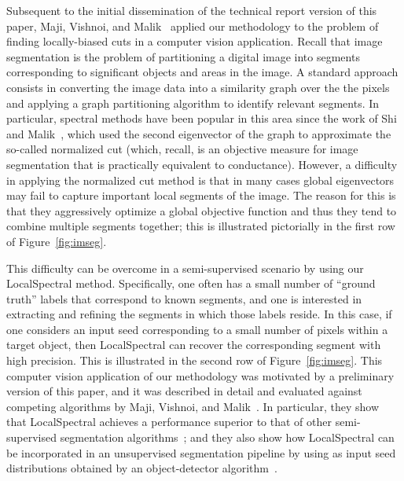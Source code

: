 \documentclass[11pt]{article}
\begin{document}
Subsequent to the initial dissemination of the technical report version of 
this paper, Maji, Vishnoi, and Malik~\cite{MVM11} applied our methodology to 
the problem of finding locally-biased cuts in a computer vision application.
Recall that image segmentation is the problem of partitioning a digital image 
into segments corresponding to significant objects and areas in the image. 
A standard approach consists in converting the image data into a similarity 
graph over the the pixels and applying a graph partitioning algorithm to 
identify relevant segments. 
In particular, spectral methods have been popular in this area since the 
work of Shi and Malik~\cite{ShiMalik00_NCut}, which used the second 
eigenvector of the graph to approximate the so-called normalized cut 
(which, recall, is an objective measure for image segmentation that is 
practically equivalent to conductance). 
However, a difficulty in applying the normalized cut method is that in many 
cases global eigenvectors may fail to capture important local segments of 
the image.
The reason for this is that they aggressively optimize a global objective 
function and thus they tend to combine multiple segments together; 
this is illustrated pictorially in the first row of Figure~\ref{fig:imseg}.

This difficulty can be overcome in a semi-supervised scenario by using 
our \textsf{LocalSpectral} method. 
Specifically, one often has a small number of ``ground truth'' labels that 
correspond to known segments, and one is interested in extracting and 
refining the segments in which those labels reside.
In this case, if one considers an input seed corresponding to a small number 
of pixels within a target object, then \textsf{LocalSpectral} can recover 
the corresponding segment with high precision.
This is illustrated in the second row of Figure~\ref{fig:imseg}. 
This computer vision application of our methodology was motivated by a 
preliminary version of this paper, and it was described in detail and evaluated against competing 
algorithms by Maji, Vishnoi, and Malik~\cite{MVM11}. 
In particular, they show that \textsf{LocalSpectral} achieves a performance superior to 
that of other semi-supervised segmentation algorithms~\cite{YS01,EOK07}; and 
they also show how \textsf{LocalSpectral} can be incorporated in an 
unsupervised segmentation pipeline by using as input seed distributions 
obtained by an object-detector algorithm~\cite{bmbm10}.
\end{document}
